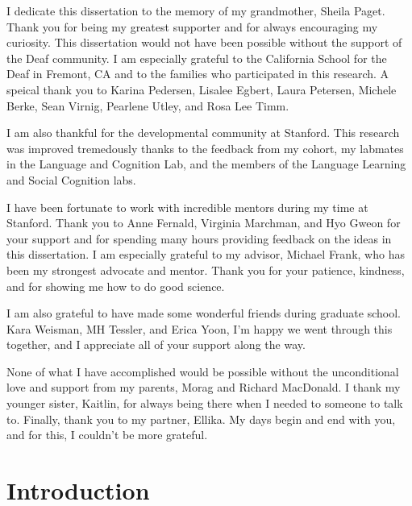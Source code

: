 \documentclass[oneside]{report}
\begin{document}
I dedicate this dissertation to the memory of my grandmother, Sheila
Paget. Thank you for being my greatest supporter and for always
encouraging my curiosity.
This dissertation would not have been possible without the support of
the Deaf community. I am especially grateful to the California School
for the Deaf in Fremont, CA and to the families who participated in this
research. A speical thank you to Karina Pedersen, Lisalee Egbert, Laura
Petersen, Michele Berke, Sean Virnig, Pearlene Utley, and Rosa Lee Timm.

I am also thankful for the developmental community at Stanford. This
research was improved tremedously thanks to the feedback from my cohort,
my labmates in the Language and Cognition Lab, and the members of the
Language Learning and Social Cognition labs.

I have been fortunate to work with incredible mentors during my time at
Stanford. Thank you to Anne Fernald, Virginia Marchman, and Hyo Gweon
for your support and for spending many hours providing feedback on the
ideas in this dissertation. I am especially grateful to my advisor,
Michael Frank, who has been my strongest advocate and mentor. Thank you
for your patience, kindness, and for showing me how to do good science.

I am also grateful to have made some wonderful friends during graduate
school. Kara Weisman, MH Tessler, and Erica Yoon, I'm happy we went
through this together, and I appreciate all of your support along the
way.

None of what I have accomplished would be possible without the
unconditional love and support from my parents, Morag and Richard
MacDonald. I thank my younger sister, Kaitlin, for always being there
when I needed to someone to talk to. Finally, thank you to my partner,
Ellika. My days begin and end with you, and for this, I couldn't be more
grateful.

\afterpreface


\chapter*{Introduction}\label{intro}
\end{document}
